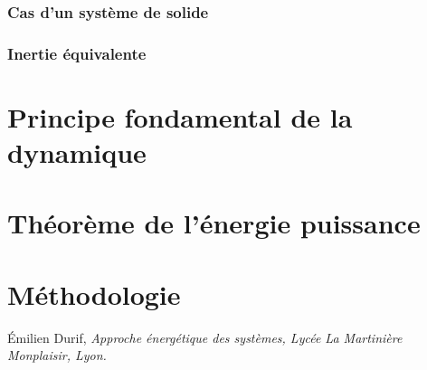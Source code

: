 \documentclass[10pt,fleqn]{article} %
\begin{document}
\subsubsection{Cas d'un système de solide}
\subsubsection{Inertie équivalente}

\section{Principe fondamental de la dynamique}

\section{Théorème de l'énergie puissance}

\section{Méthodologie}





\begin{thebibliography}{2}
    Émilien Durif, {\it Approche énergétique des systèmes, Lycée La Martinière Monplaisir, Lyon.}
\end{thebibliography}
\end{document}
